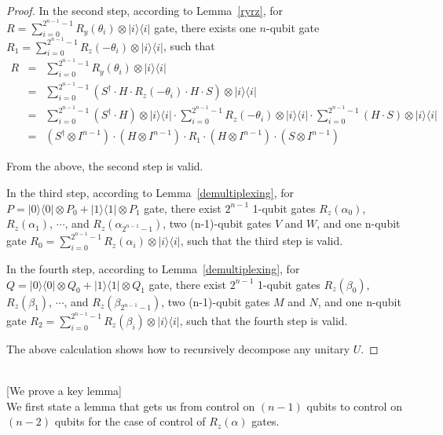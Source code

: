 \documentclass[11pt]{article}
\def\ket#1{|#1\rangle}
\def\bra#1{\langle#1|}
\def\outer#1#2{\ket{#1}\bra{#2}}
\begin{document}
\begin{proof}
In the second step, according to Lemma~\ref{ryrz}, for $R = \sum^{2^{n-1}-1}_{i=0}R_y(\theta_i) \otimes \outer{i}{i}$ gate, there exists one $n$-qubit gate $R_1 = \sum^{2^{n-1}-1}_{i=0}R_z(-\theta_i) \otimes \outer{i}{i}$, such that 
\begin{eqnarray*}
R & = & \sum^{2^{n-1}-1}_{i=0}R_y(\theta_i) \otimes \outer{i}{i} \\
& = & \sum^{2^{n-1}-1}_{i=0} ( S^\dag \cdot H \cdot R_z(-\theta_i) \cdot H \cdot S )\otimes \outer{i}{i} \\
& = & \sum^{2^{n-1}-1}_{i=0} ( S^\dag \cdot H )\otimes \outer{i}{i} \cdot  \sum^{2^{n-1}-1}_{i=0}   R_z(-\theta_i) \otimes \outer{i}{i}  \cdot \sum^{2^{n-1}-1}_{i=0} ( H \cdot S )\otimes \outer{i}{i} \\
& = & (S^\dag \otimes I^{n-1}) \cdot (H \otimes I^{n-1}) \cdot R_1 \cdot (H \otimes I^{n-1}) \cdot (S \otimes I^{n-1})
\end{eqnarray*}

From the above, the second step is valid. 

In the third step, according to Lemma~\ref{demultiplexing}, for $P = \outer{0}{0} \otimes P_{0} + \outer{1}{1} \otimes P_{1} $ gate, there exist $2^{n-1}$ 1-qubit gates $R_z(\alpha_0)$, $R_z(\alpha_1)$, $\cdots$, and $R_z(\alpha_{2^{n-1}-1})$, two (n-1)-qubit gates $V$ and $W$, and one n-qubit gate $R_0 = \sum^{2^{n-1}-1}_{i=0}R_{z}(\alpha_i) \otimes \outer{i}{i}$, such that the third step is valid. 

In the fourth step, according to Lemma~\ref{demultiplexing}, for $Q = \outer{0}{0} \otimes Q_{0} + \outer{1}{1} \otimes Q_{1} $ gate, there exist $2^{n-1}$ 1-qubit gates $R_z(\beta_0)$, $R_z(\beta_1)$, $\cdots$, and $R_z(\beta_{2^{n-1}-1})$, two (n-1)-qubit gates $M$ and $N$, and one n-qubit gate $R_2 = \sum^{2^{n-1}-1}_{i=0}R_{z}(\beta_i) \otimes \outer{i}{i}$, such that the fourth step is valid.

The above calculation shows how to recursively decompose any unitary $U$.
\end{proof}
 
\mbox{} \\ \hspace*{1cm}
   [We prove a key lemma] \\
We first state a lemma that gets us from control on $(n-1)$ qubits to
control on $(n-2)$ qubits for the case of control of $R_z(\alpha)$ gates.
\end{document}
